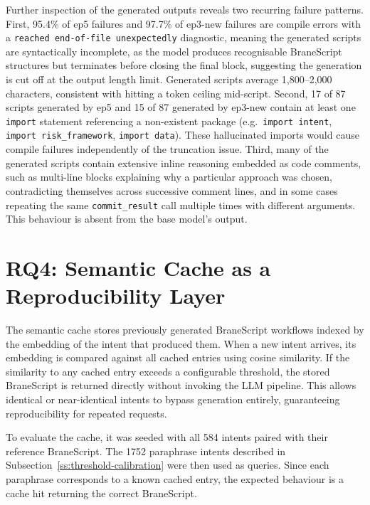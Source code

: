 Further inspection of the generated outputs reveals two recurring failure patterns.
First, 95.4\% of ep5 failures and 97.7\% of ep3-new failures are compile
errors with a \texttt{reached end-of-file unexpectedly} diagnostic, meaning
the generated scripts are syntactically incomplete, as the model produces
recognisable BraneScript structures but terminates before closing the final
block, suggesting the generation is cut off at the output length limit.
Generated scripts average 1{,}800--2{,}000 characters, consistent with
hitting a token ceiling mid-script. Second, 17 of 87 scripts generated by ep5
and 15 of 87 generated by ep3-new contain at least one \texttt{import}
statement referencing a non-existent package (e.g.\ \texttt{import intent},
\texttt{import risk\_framework}, \texttt{import data}). These hallucinated
imports would cause compile failures independently of the truncation issue.
Third, many of the generated scripts contain extensive inline reasoning
embedded as code comments, such as multi-line blocks explaining why a particular
approach was chosen, contradicting themselves across successive comment lines,
and in some cases repeating the same \texttt{commit\_result} call multiple
times with different arguments. This behaviour is absent from the base model's
output.

\newpage

\section{RQ4: Semantic Cache as a Reproducibility Layer}\label{s:eval-cache}

The semantic cache stores previously generated BraneScript workflows indexed
by the embedding of the intent that produced them. When a new intent arrives,
its embedding is compared against all cached entries using cosine similarity.
If the similarity to any cached entry exceeds a configurable threshold, the
stored BraneScript is returned directly without invoking the LLM pipeline.
This allows identical or near-identical intents to bypass generation entirely,
guaranteeing reproducibility for repeated requests.

To evaluate the cache, it was seeded with all 584 intents paired with
their reference BraneScript. The 1752 paraphrase intents described in
Subsection~\ref{ss:threshold-calibration} were then used as queries. Since each paraphrase
corresponds to a known cached entry, the expected behaviour is a cache hit returning the correct BraneScript.


